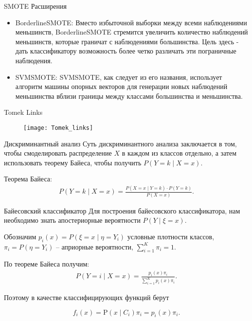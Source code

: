 \documentclass[11pt]{beamer}
\begin{document}
\begin{frame}{SMOTE Расширения}
	
	\begin{itemize}
		\item BorderlineSMOTE: Вместо избыточной выборки между всеми наблюдениями меньшинств, BorderlineSMOTE стремится увеличить количество наблюдений меньшинств, которые граничат с наблюдениями большинства. Цель здесь - дать классификатору возможность более четко различать эти пограничные наблюдения.
		\item SVMSMOTE: SVMSMOTE, как следует из его названия, использует алгоритм машины опорных векторов для генерации новых наблюдений меньшинства вблизи границы между классами большинства и меньшинства.
	\end{itemize}
	
\end{frame}

\begin{frame}{Tomek Links}
	
	\begin{figure}[hhh!]
		\begin{center}
			\texttt{[image: Tomek\_links]}
		\end{center}
		\vspace{-5mm}
	\end{figure}
	
\end{frame}


\begin{frame}{Дискриминантный анализ}
Суть дискриминантного анализа заключается в том, чтобы смоделировать распределение $X$ в каждом из классов отдельно, а затем использовать теорему Байеса, чтобы получить $P(Y = k \mid X = x)$.

\pause


Теорема Байеса:
\begin{align*}
	P(Y	= k \mid X = x) = \frac{P(X = x \mid Y = k) \cdot P(Y = k)}{P(X = x)}.
\end{align*}

\end{frame}

\begin{frame}{Байесовский классификатор}
	\bigskip
Для построения байесовского классификатора, нам необходимо знать апостериорные вероятности $P(Y \mid \xi = x)$.

Обозначим $p_i(x) = P(\xi = x \mid \eta =Y_i)$ условные плотности классов, $\pi_i = P(\eta = Y_i)$ -- априорные вероятности, $\sum_{i = 1}^{K} \pi_i = 1$. 

\pause
\bigskip
\bigskip
По теореме Байеса получим:
\begin{align*}
	P(Y = i \mid X = x) = \frac{p_i(x) \pi_i}{\sum_{i = 1}^K p_i(x)\pi_i}.
\end{align*}

Поэтому в качестве классифицирующих функций берут

$$f_i\left(x\right) = \mathrm P\left(x\middle\vert C_i\right) \pi_i = p_i(x) \pi_i.$$

\end{frame}
\end{document}
